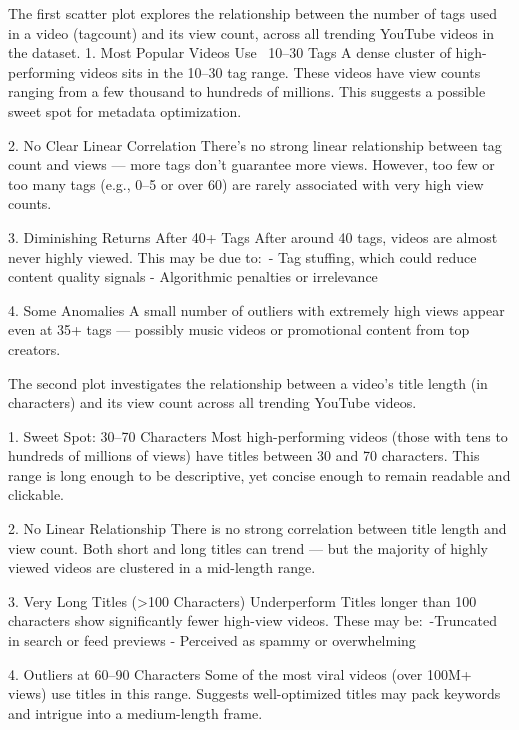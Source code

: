 \documentclass[a4paper]{article}
\begin{document}
\begin{multicols}{2} 

The first scatter plot explores the relationship between the number of tags used in a video (tagcount) and its view count, across all trending YouTube videos in the dataset.
1. Most Popular Videos Use ~10–30 Tags
A dense cluster of high-performing videos sits in the 10–30 tag range.
These videos have view counts ranging from a few thousand to hundreds of millions.
This suggests a possible sweet spot for metadata optimization.

2. No Clear Linear Correlation
There’s no strong linear relationship between tag count and views — more tags don’t guarantee more views.
However, too few or too many tags (e.g., 0–5 or over 60) are rarely associated with very high view counts.

3. Diminishing Returns After 40+ Tags
After around 40 tags, videos are almost never highly viewed.
This may be due to:\
- Tag stuffing, which could reduce content quality signals
- Algorithmic penalties or irrelevance

4. Some Anomalies
A small number of outliers with extremely high views appear even at 35+ tags — possibly music videos or promotional content from top creators.



The second plot investigates the relationship between a video’s title length (in characters) and its view count across all trending YouTube videos.

1. Sweet Spot: 30–70 Characters
Most high-performing videos (those with tens to hundreds of millions of views) have titles between 30 and 70 characters.
This range is long enough to be descriptive, yet concise enough to remain readable and clickable.

2. No Linear Relationship
There is no strong correlation between title length and view count.
Both short and long titles can trend — but the majority of highly viewed videos are clustered in a mid-length range.

3. Very Long Titles (>100 Characters) Underperform
Titles longer than 100 characters show significantly fewer high-view videos.
These may be:\
-Truncated in search or feed previews
- Perceived as spammy or overwhelming

4. Outliers at 60–90 Characters
Some of the most viral videos (over 100M+ views) use titles in this range.
Suggests well-optimized titles may pack keywords and intrigue into a medium-length frame.




\end{multicols}
\end{document}
